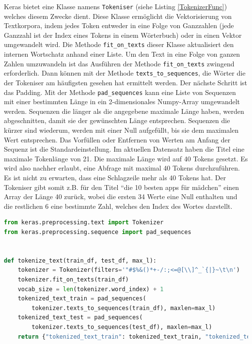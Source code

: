 Keras bietet eine Klasse namens \texttt{Tokeniser} (siehe Listing \ref{TokenizerFunc}) welches diesem Zwecke dient. Diese Klasse ermöglicht die Vektorisierung von Textkorpora, indem jedes Token entweder in eine Folge von Ganzzahlen (jede Ganzzahl ist der Index eines Tokens in einem Wörterbuch) oder in einen Vektor umgewandelt wird. Die Methode \texttt{fit\_on\_texts} dieser Klasse aktualisiert den internen Wortschatz anhand einer Liste. Um den Text in eine Folge von ganzen Zahlen umzuwandeln ist das Ausführen der Methode \texttt{fit\_on\_texts} zwingend erforderlich. Dann können mit der Methode \texttt{texts\_to\_sequences}, die Wörter die der Tokeniser am häufigsten gesehen hat ermittelt werden. Der nächste Schritt ist das Padding. Mit der Methode \texttt{pad\_sequences} kann eine Liste von Sequenzen mit einer bestimmten Länge in ein 2-dimensionales Numpy-Array umgewandelt werden. Sequenzen die länger als die angegebene maximale Länge haben, werden abgeschnitten, damit sie der gewünschten Länge entsprechen. Sequenzen die kürzer sind wiederum, werden mit einer Null aufgefüllt, bis sie dem maximalen Wert entsprechen. Das Vorfüllen oder Entfernen von Werten am Anfang der Sequenz ist die Standardeinstellung. Im aktuellen Datensatz haben die Titel  eine maximale Tokenlänge von 21. Die maximale Länge wird auf 40 Tokens gesetzt. Es wird also nachher erlaubt, eine Abfrage mit maximal 40 Tokens durchzuführen. Es ist nicht zu erwarten, dass eine Schlagzeile mehr als 40 Tokens hat. Der Tokeniser gibt somit z.B. für den Titel \enquote{die 10 besten apps für mädchen} einen Array der Länge 40 zurück, wobei die ersten 34 Werte eine Null enthalten und die restlichen 6 eine bestimmte Zahl, welches den Index des Wortes darstellt.



\begin{lstlisting}[language=Python,caption=Die Tokeniser-Funktion, label={TokenizerFunc}]
from keras.preprocessing.text import Tokenizer
from keras.preprocessing.sequence import pad_sequences


def tokenize_text(train_df, test_df, max_l):
    tokenizer = Tokenizer(filters='"#$%&()*+-/:;<=@[\\]^_`{|}~\t\n')
    tokenizer.fit_on_texts(train_df)
    vocab_size = len(tokenizer.word_index) + 1
    tokenized_text_train = pad_sequences(
        tokenizer.texts_to_sequences(train_df), maxlen=max_l)
    tokenized_text_test = pad_sequences(
        tokenizer.texts_to_sequences(test_df), maxlen=max_l)
    return {"tokenized_text_train": tokenized_text_train, "tokenized_text_test": tokenized_text_test, "vocab_size": vocab_size, "tokenizer": tokenizer}
\end{lstlisting}


